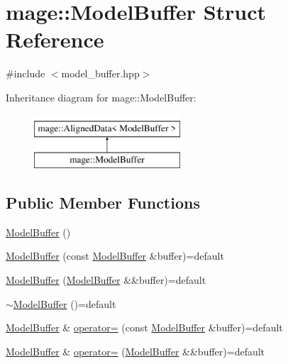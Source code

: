\hypertarget{structmage_1_1_model_buffer}{}\section{mage\+:\+:Model\+Buffer Struct Reference}
\label{structmage_1_1_model_buffer}


{\ttfamily \#include $<$model\+\_\+buffer.\+hpp$>$}

Inheritance diagram for mage\+:\+:Model\+Buffer\+:\begin{figure}[H]
\begin{center}
\leavevmode
\includegraphics[height=2.000000cm]{structmage_1_1_model_buffer}
\end{center}
\end{figure}
\subsection*{Public Member Functions}
\begin{DoxyCompactItemize}
\item 
\hyperlink{structmage_1_1_model_buffer_a9069cfb6d75067b7f1509332fbec9be0}{Model\+Buffer} ()
\item 
\hyperlink{structmage_1_1_model_buffer_a593635ac135a8390b606e5e47174d2e5}{Model\+Buffer} (const \hyperlink{structmage_1_1_model_buffer}{Model\+Buffer} \&buffer)=default
\item 
\hyperlink{structmage_1_1_model_buffer_a56ec1df93cbf6505c513cf5f440fdc4f}{Model\+Buffer} (\hyperlink{structmage_1_1_model_buffer}{Model\+Buffer} \&\&buffer)=default
\item 
\hyperlink{structmage_1_1_model_buffer_a9536832e39a72cc597c41ca245eb52ba}{$\sim$\+Model\+Buffer} ()=default
\item 
\hyperlink{structmage_1_1_model_buffer}{Model\+Buffer} \& \hyperlink{structmage_1_1_model_buffer_a003f2105c63f3d7e735c1c00bab5fdee}{operator=} (const \hyperlink{structmage_1_1_model_buffer}{Model\+Buffer} \&buffer)=default
\item 
\hyperlink{structmage_1_1_model_buffer}{Model\+Buffer} \& \hyperlink{structmage_1_1_model_buffer_a2f2c8c5ec6a43c239f349e3c015320e0}{operator=} (\hyperlink{structmage_1_1_model_buffer}{Model\+Buffer} \&\&buffer)=default
\end{DoxyCompactItemize}
